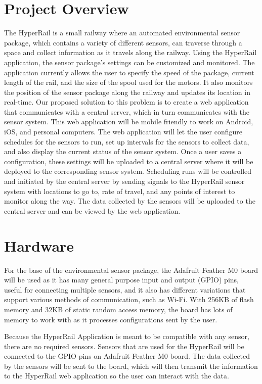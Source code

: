 \documentclass[onecolumn, draftclsnofoot,10pt, compsoc]{IEEEtran}
\begin{document}
\section{Project Overview}
The HyperRail is a small railway where an automated environmental sensor package, which contains a variety of different sensors, can traverse through a space and collect information as it travels along the railway. Using the HyperRail application, the sensor package's settings can be customized and monitored. The application currently allows the user to specify the speed of the package, current length of the rail, and the size of the spool used for the motors. It also monitors the position of the sensor package along the railway and updates its location in real-time. Our proposed solution to this problem is to create a web application that communicates with a central server, which in turn communicates with the sensor system. This web application will be mobile friendly to work on Android, iOS, and personal computers. The web application will let the user configure schedules for the sensors to run, set up intervals for the sensors to collect data, and also display the current status of the sensor system. Once a user saves a configuration, these settings will be uploaded to a central server where it will be deployed to the corresponding sensor system. Scheduling runs will be controlled and initiated by the central server by sending signals to the HyperRail sensor system with locations to go to, rate of travel, and any points of interest to monitor along the way. The data collected by the sensors will be uploaded to the central server and can be viewed by the web application. 


\section{Hardware}
For the base of the environmental sensor package, the Adafruit Feather M0 board will be used as it has many general purpose input and output (GPIO) pins, useful for connecting multiple sensors, and it also has different variations that support various methods of communication, such as Wi-Fi. With 256KB of flash memory and 32KB of static random access memory, the board has lots of memory to work with as it processes configurations sent by the user.

Because the HyperRail Application is meant to be compatible with any sensor, there are no required sensors. Sensors that are used for the HyperRail will be connected to the GPIO pins on Adafruit Feather M0 board. The data collected by the sensors will be sent to the board, which will then transmit the information to the HyperRail web application so the user can interact with the data.
\end{document}
